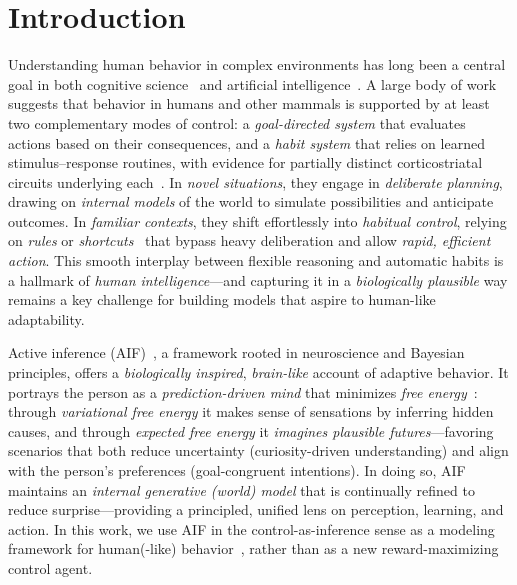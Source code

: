 \documentclass{article} %
\newcommand{\revise}[1]{#1}
\begin{document}
\setlength{\abovedisplayskip}{0.5pt}
\setlength{\abovedisplayshortskip}{0pt}
\setlength{\belowdisplayskip}{0.5pt}
\setlength{\belowdisplayshortskip}{0pt}
\setlength{\jot}{2pt}
\setlength{\floatsep}{1.2ex}
\setlength{\textfloatsep}{1.2ex}
\setlength{\intextsep}{0.5ex}
\setlength{\topsep}{0.3ex}
\setlength{\partopsep}{0pt}
\setlength{\parskip}{0.3ex}

\section{Introduction}
\label{sec:intro}

Understanding human behavior in complex environments has long been a central goal in both cognitive science~\citep{pylyshyn1980computation} and artificial intelligence~\citep{leichtmann2023effects}. \revise{A large body of work suggests that behavior in humans and other mammals is supported by at least two complementary modes of control: a {\it goal-directed system} that evaluates actions based on their consequences, and a {\it habit system} that relies on learned stimulus–response routines, with evidence for partially distinct corticostriatal circuits underlying each~\citep{balleine2010human,dolan2013goals}.}
In \emph{novel situations}, they engage in \emph{deliberate planning}, drawing on \emph{internal models} of the world to simulate possibilities and anticipate outcomes. In \emph{familiar contexts}, they shift effortlessly into \emph{habitual control}, relying on \emph{rules} or \emph{shortcuts}~\citep{neal2012habits} that bypass heavy deliberation and allow \emph{rapid, efficient action}. This smooth interplay between flexible reasoning and automatic habits is a hallmark of \emph{human intelligence}—and capturing it in a \emph{biologically plausible} way remains a key challenge for building models that aspire to human-like adaptability.

Active inference (AIF)~\citep{mazzaglia2022free}, a framework rooted in neuroscience and Bayesian principles, offers a \emph{biologically inspired}, \emph{brain-like} account of adaptive behavior. It portrays the person as a \emph{prediction-driven mind} that minimizes \emph{free energy}~\citep{parr2019generalised, millidge2021whence}: through \emph{variational free energy} it makes sense of sensations by inferring hidden causes, and through \emph{expected free energy} it \emph{imagines plausible futures}—favoring scenarios that both reduce uncertainty (curiosity-driven understanding) and align with the person’s preferences (goal-congruent intentions). In doing so, AIF maintains an \emph{internal generative (world) model} that is continually refined to reduce surprise—providing a principled, unified lens on perception, learning, and action. \revise{In this work, we use AIF in the control-as-inference sense as a modeling framework for human(-like) behavior~\citep{levine2018reinforcement, toussaint2009robot}, rather than as a new reward-maximizing control agent.}
\end{document}
